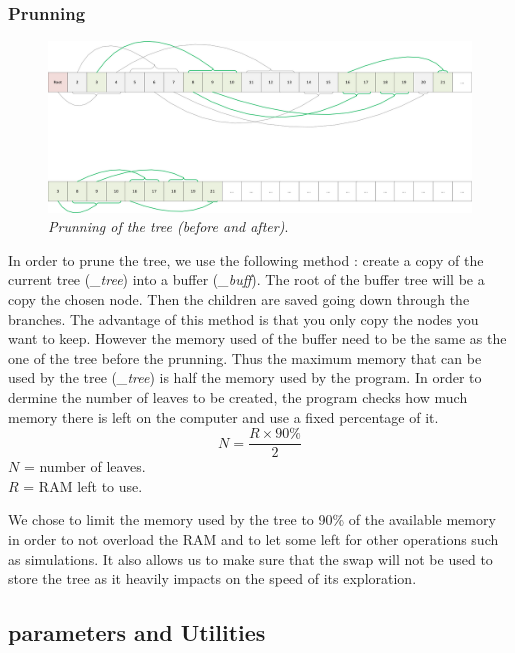 \subsubsection{Prunning}
\begin{figure}[H] 
\centerline{\includegraphics[width=\textwidth]{Data_Structure/Img/array.png}}
\caption{\label{fig:arrayprunning}\textit{Prunning of the tree (before and after)}.}
\end{figure}
In order to prune the tree, we use the following method : create a copy of the current tree (\textit{\_tree}) into a buffer (\textit{\_buff}). The root of the buffer tree will be a copy the chosen node. Then the children are saved going down through the branches. The advantage of this method is that you only copy the nodes you want to keep. However the memory used of the buffer need to be the same as the one of the tree before the prunning. Thus the maximum memory that can be used by the tree (\textit{\_tree}) is half the memory used by the program. In order to dermine the number of leaves to be created, the program checks how much memory there is left on the computer and use a fixed percentage of it.
\begin{equation}
N = \frac{R \times 90\%}{2}
\end{equation}
\ensuremath{N} = number of leaves.\\
\ensuremath{R} = RAM left to use.

We chose to limit the memory used by the tree to 90\% of the available memory in order to not overload the RAM and to let some left for other operations such as simulations. It also allows us to make sure that the swap will not be used to store the tree as it heavily impacts on the speed of its exploration.
\newpage
\subsection{parameters and Utilities}
